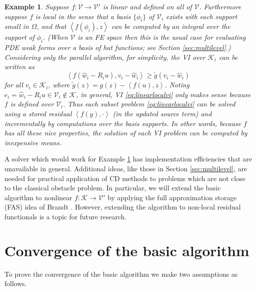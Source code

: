 \documentclass[letterpaper,final,12pt,reqno]{amsart}
\theoremstyle{cstyle}
\theoremstyle{cstyle*}
\theoremstyle{dstyle}
\newtheorem{example}[theorem]{Example}
\numberwithin{equation}{section}
\numberwithin{figure}{section}
\numberwithin{table}{section}
\numberwithin{theorem}{section}
\newcommand{\cK}{\mathcal{K}}
\newcommand{\cV}{\mathcal{V}}
\newcommand{\ip}[2]{\left<#1,#2\right>}
\begin{document}
\begin{example}  \label{ex:fnice} Suppose $f:\cV \to \cV'$ is linear and defined on all of $\cV$.  Furthermore suppose $f$ is local in the sense that a basis $\{\phi_i\}$ of $\cV_i$ exists with each support small in $\Omega$, and that $\ip{f(\phi_i)}{z}$ can be computed by an integral over the support of $\phi_i$.  (When $\cV$ is an FE space then this is the usual case for evaluating PDE weak forms over a basis of hat functions; see Section \ref{sec:multilevel}.)  Considering only the parallel algorithm, for simplicity, the VI over $\cK_i$ can be written as
\begin{equation}
\ip{f(\hat w_i - R_i u)}{v_i-\hat w_i} \ge \tilde g(v_i-\hat w_i) \label{eq:linearlocalvi}
\end{equation}
for all $v_i\in \cK_i$, where $\tilde g(z) = g(z) - \ip{f(u)}{z}$.  Noting $e_i = \hat w_i - R_i u \in \cV_i \notin \cK$, in general, VI \eqref{eq:linearlocalvi} only makes sense because $f$ is defined over $\cV_i$.  Thus each subset problem \eqref{eq:linearlocalvi} can be solved using a stored residual $\ip{f(y)}{\cdot}$ (in the updated source term) and incrementally by computations over the basis supports.  In other words, because $f$ has all these nice properties, the solution of each VI problem can be computed by inexpensive means.
\end{example}

A solver which would work for Example \ref{ex:fnice} has implementation efficiencies that are unavailable in general.  Additional ideas, like those in Section \ref{sec:multilevel}, are needed for practical application of CD methods to problems which are not close to the classical obstacle problem.  In particular, we will extend the basic algorithm to nonlinear $f:\cK\to \cV'$ by applying the full approximation storage (FAS) idea of Brandt \cite{Brandt1977}.  However, extending the algorithm to non-local residual functionals is a topic for future research.


\section{Convergence of the basic algorithm} \label{sec:convergence}

To prove the convergence of the basic algorithm we make two assumptions as follows.
\end{document}
